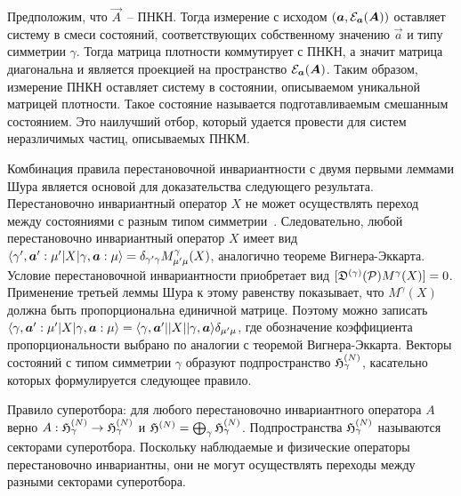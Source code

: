 \documentclass[a4paper, 12pt]{article}
\begin{document}
Предположим, что $\vec{A}$~-- ПНКН. Тогда измерение с исходом
$\left( {\boldsymbol{a}}{}, {\mathcal{E}}_{\boldsymbol{a}}{}({\boldsymbol{A}}{})\right)$ оставляет систему в смеси 
состояний, соответствующих собственному значению $\vec{a}$ и типу 
симметрии $\gamma$. Тогда матрица плотности коммутирует с ПНКН, а значит 
матрица диагональна и является проекцией на пространство 
${\mathcal{E}}_{\boldsymbol{a}}{}({\boldsymbol{A}}{})$. Таким образом, измерение ПНКН оставляет систему 
в состоянии, описываемом уникальной матрицей плотности. Такое состояние 
называется подготавливаемым смешанным состоянием. Это наилучший отбор, 
который удается провести для систем неразличимых частиц, описываемых 
ПНКМ.


\label{sec:paper:4.3}

Комбинация правила перестановочной инвариантности с двумя первыми 
леммами Шура %
является основой для доказательства следующего результата. 
Перестановочно инвариантный оператор $X$ не может осуществлять переход 
между состояниями с разным типом симметрии~\cite{ref1}. %
Следовательно, любой перестановочно инвариантный оператор $X$ имеет вид
$ {\left\langle\gamma', {\boldsymbol{a}}{}' : \mu'\middle|X\middle|\gamma, {\boldsymbol{a}}{}: \mu\right\rangle}
= \delta_{\gamma' \gamma} M^\gamma_{\mu'\mu} (X)$, аналогично теореме 
Вигнера-Эккарта.
%
Условие перестановочной инвариантности приобретает вид
$[{\mathfrak{D}^{(\gamma)}}{}({\mathcal{P}}) M^\gamma(X)] = 0$. Применение третьей леммы Шура 
к этому равенству показывает, что $M^\gamma(X)$ должна быть 
пропорциональна единичной матрице. Поэтому можно записать
$ {\left\langle\gamma, {\boldsymbol{a}}{}' : \mu'\middle|X\middle|\gamma, {\boldsymbol{a}}{}: \mu\right\rangle}
= {\left\langle\gamma, {\boldsymbol{a}}{}'\middle|\middle|X\middle|\middle|\gamma, {\boldsymbol{a}}{}\right\rangle}
\delta_{\mu'\mu}$, где обозначение коэффициента пропорциональности 
выбрано по аналогии с теоремой Вигнера-Эккарта.
%
Векторы состояний с типом симметрии $\gamma$ образуют подпространство 
$\mathfrak{H}^{(N)}_\gamma$, касательно которых формулируется следующее правило.

Правило суперотбора: для любого перестановочно инвариантного оператора 
$A$ верно $A: \mathfrak{H}^{(N)}_\gamma \to \mathfrak{H}^{(N)}_\gamma$ и $\mathfrak{H}^{(N)} 
= \bigoplus_\gamma \mathfrak{H}^{(N)}_\gamma$. Подпространства $\mathfrak{H}^{(N)}_\gamma$ 
называются секторами суперотбора. Поскольку наблюдаемые и физические 
операторы перестановочно инвариантны, они не могут осуществлять переходы 
между разными секторами суперотбора.
\end{document}
